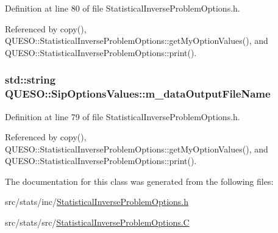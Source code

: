 Definition at line 80 of file Statistical\-Inverse\-Problem\-Options.\-h.



Referenced by copy(), Q\-U\-E\-S\-O\-::\-Statistical\-Inverse\-Problem\-Options\-::get\-My\-Option\-Values(), and Q\-U\-E\-S\-O\-::\-Statistical\-Inverse\-Problem\-Options\-::print().

\hypertarget{class_q_u_e_s_o_1_1_sip_options_values_a5b68edcbfca8473657ee8d58cfc16fb6}{
\subsubsection[{m\-\_\-data\-Output\-File\-Name}]{\setlength{\rightskip}{0pt plus 5cm}std\-::string Q\-U\-E\-S\-O\-::\-Sip\-Options\-Values\-::m\-\_\-data\-Output\-File\-Name}}\label{class_q_u_e_s_o_1_1_sip_options_values_a5b68edcbfca8473657ee8d58cfc16fb6}


Definition at line 79 of file Statistical\-Inverse\-Problem\-Options.\-h.



Referenced by copy(), Q\-U\-E\-S\-O\-::\-Statistical\-Inverse\-Problem\-Options\-::get\-My\-Option\-Values(), and Q\-U\-E\-S\-O\-::\-Statistical\-Inverse\-Problem\-Options\-::print().



The documentation for this class was generated from the following files\-:\begin{DoxyCompactItemize}
\item 
src/stats/inc/\hyperlink{_statistical_inverse_problem_options_8h}{Statistical\-Inverse\-Problem\-Options.\-h}\item 
src/stats/src/\hyperlink{_statistical_inverse_problem_options_8_c}{Statistical\-Inverse\-Problem\-Options.\-C}\end{DoxyCompactItemize}
